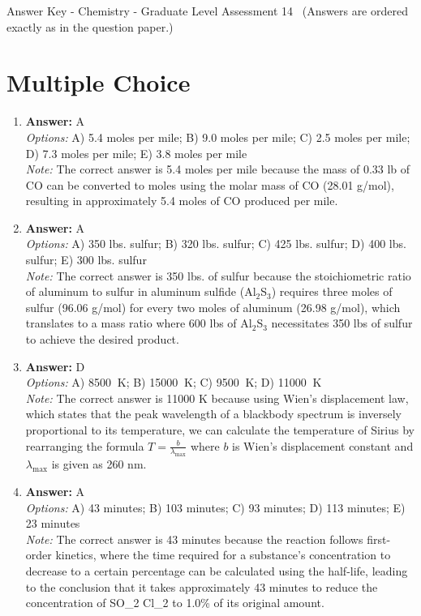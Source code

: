 \documentclass[12pt]{article}
\begin{document}
\begin{center}
Answer Key - Chemistry - Graduate Level Assessment 14 \
\small (Answers are ordered exactly as in the question paper.)
\end{center}

\section*{Multiple Choice}
\begin{enumerate}[label=\arabic*.]
\item \textbf{Answer:} A
\\ \textit{Options:} A) 5.4 moles per mile; B) 9.0 moles per mile; C) 2.5 moles per mile; D) 7.3 moles per mile; E) 3.8 moles per mile
\\ \textit{Note:} The correct answer is 5.4 moles per mile because the mass of 0.33 lb of CO can be converted to moles using the molar mass of CO (28.01 g/mol), resulting in approximately 5.4 moles of CO produced per mile.
\item \textbf{Answer:} A
\\ \textit{Options:} A) 350 lbs. sulfur; B) 320 lbs. sulfur; C) 425 lbs. sulfur; D) 400 lbs. sulfur; E) 300 lbs. sulfur
\\ \textit{Note:} The correct answer is 350 lbs. of sulfur because the stoichiometric ratio of aluminum to sulfur in aluminum sulfide (Al$_{2}$S$_{3}$) requires three moles of sulfur (96.06 g/mol) for every two moles of aluminum (26.98 g/mol), which translates to a mass ratio where 600 lbs of Al$_{2}$S$_{3}$ necessitates 350 lbs of sulfur to achieve the desired product.
\item \textbf{Answer:} D
\\ \textit{Options:} A) 8500 $\mathrm{~K}$; B) 15000 $\mathrm{~K}$; C) 9500 $\mathrm{~K}$; D) 11000 $\mathrm{~K}$
\\ \textit{Note:} The correct answer is 11000 K because using Wien's displacement law, which states that the peak wavelength of a blackbody spectrum is inversely proportional to its temperature, we can calculate the temperature of Sirius by rearranging the formula \( T = \frac{b}{\lambda_{\max}} \) where \( b \) is Wien's displacement constant and \( \lambda_{\max} \) is given as 260 nm.
\item \textbf{Answer:} A
\\ \textit{Options:} A) 43 minutes; B) 103 minutes; C) 93 minutes; D) 113 minutes; E) 23 minutes
\\ \textit{Note:} The correct answer is 43 minutes because the reaction follows first-order kinetics, where the time required for a substance's concentration to decrease to a certain percentage can be calculated using the half-life, leading to the conclusion that it takes approximately 43 minutes to reduce the concentration of SO\_2 Cl\_2 to 1.0\% of its original amount.

\end{enumerate}
\end{document}
